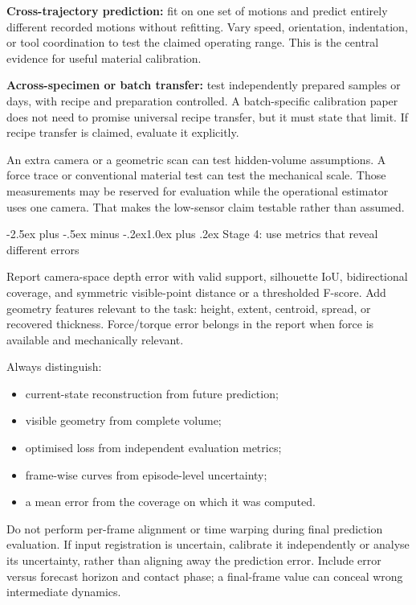 \documentclass[
  11pt,
]{article}
\makeatletter
\providecommand{\tightlist}{%
  \setlength{\itemsep}{0pt}\setlength{\parskip}{0pt}}
\renewcommand\subsection{\needspace{5\baselineskip}\@startsection{subsection}{2}{\z@}%
  {-2.5ex plus -.5ex minus -.2ex}{1.0ex plus .2ex}%
  {\normalfont\sffamily\large\bfseries\color{accent}}}
\makeatother
\begin{document}
\textbf{Cross-trajectory prediction:} fit on one set of motions and
predict entirely different recorded motions without refitting. Vary
speed, orientation, indentation, or tool coordination to test the
claimed operating range. This is the central evidence for useful
material calibration.

\textbf{Across-specimen or batch transfer:} test independently prepared
samples or days, with recipe and preparation controlled. A
batch-specific calibration paper does not need to promise universal
recipe transfer, but it must state that limit. If recipe transfer is
claimed, evaluate it explicitly.

An extra camera or a geometric scan can test hidden-volume assumptions.
A force trace or conventional material test can test the mechanical
scale. Those measurements may be reserved for evaluation while the
operational estimator uses one camera. That makes the low-sensor claim
testable rather than assumed.

\subsection{Stage 4: use metrics that reveal different
errors}\label{stage-4-use-metrics-that-reveal-different-errors}

Report camera-space depth error with valid support, silhouette IoU,
bidirectional coverage, and symmetric visible-point distance or a
thresholded F-score. Add geometry features relevant to the task: height,
extent, centroid, spread, or recovered thickness. Force/torque error
belongs in the report when force is available and mechanically relevant.

Always distinguish:

\begin{itemize}
\tightlist
\item
  current-state reconstruction from future prediction;
\item
  visible geometry from complete volume;
\item
  optimised loss from independent evaluation metrics;
\item
  frame-wise curves from episode-level uncertainty;
\item
  a mean error from the coverage on which it was computed.
\end{itemize}

Do not perform per-frame alignment or time warping during final
prediction evaluation. If input registration is uncertain, calibrate it
independently or analyse its uncertainty, rather than aligning away the
prediction error. Include error versus forecast horizon and contact
phase; a final-frame value can conceal wrong intermediate dynamics.
\end{document}
